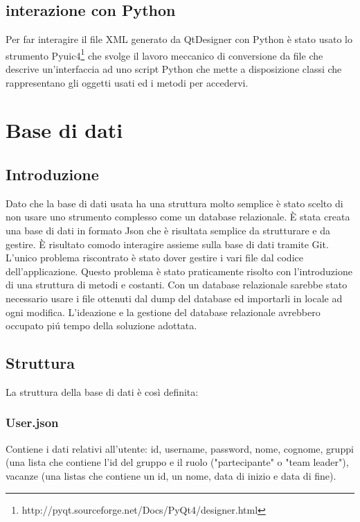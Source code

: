 \documentclass[12pt]{scrartcl}
\begin{document}
\subsection{interazione con Python}
Per far interagire il file XML generato da QtDesigner con Python
\`e stato usato lo strumento Pyuic4\footnote{http://pyqt.sourceforge.net/Docs/PyQt4/designer.html}
che svolge il lavoro meccanico di conversione da file che descrive un'interfaccia
ad uno script Python che mette a disposizione classi che rappresentano
gli oggetti usati ed i metodi  per accedervi.

\section{Base di dati}
\subsection{Introduzione}
    Dato che la base di dati usata ha una struttura molto semplice \`e stato scelto
    di non usare uno strumento complesso come un database relazionale. 
    \`E stata creata una base di dati in formato Json che \`e risultata semplice da
    strutturare e da gestire. \`E risultato comodo interagire assieme sulla base
    di dati tramite Git. L'unico problema riscontrato \`e stato dover gestire i vari
    file dal codice dell'applicazione. Questo problema \`e stato praticamente risolto
    con l'introduzione di una struttura di metodi e costanti.
    Con un database relazionale sarebbe stato necessario usare
    i file ottenuti dal dump del database ed importarli in locale ad ogni modifica.
    L'ideazione e la gestione del database relazionale avrebbero occupato pi\'u tempo
    della soluzione adottata.
\subsection{Struttura}
    La struttura della base di dati \`e cos\`i definita:
    
    
    \subsubsection{User.json}
        Contiene i dati relativi all'utente: id, username, password, nome, cognome, gruppi (una lista che
        contiene l'id del gruppo e il ruolo ("partecipante" o "team leader"), vacanze (una listas che
        contiene un id, un nome, data di inizio e data di fine).
    
\end{document}

